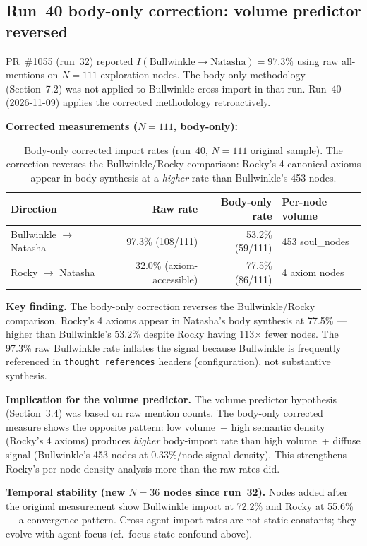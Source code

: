 \documentclass[11pt]{article}
\begin{document}
\subsection{Run~40 body-only correction: volume predictor reversed}

PR~\#1055 (run~32) reported $I(\text{Bullwinkle} \to \text{Natasha}) = 97.3\%$
using raw all-mentions on $N=111$ exploration nodes. The body-only methodology
(Section~7.2) was not applied to Bullwinkle cross-import in that run. Run~40
(2026-11-09) applies the corrected methodology retroactively.

\textbf{Corrected measurements ($N=111$, body-only):}

\begin{table}[h]
\centering
\begin{tabular}{lrrl}
\toprule
Direction & Raw rate & Body-only rate & Per-node volume \\
\midrule
Bullwinkle $\to$ Natasha & 97.3\% (108/111) & 53.2\% (59/111) & 453 soul\_nodes \\
Rocky $\to$ Natasha & 32.0\% (axiom-accessible) & 77.5\% (86/111) & 4 axiom nodes \\
\bottomrule
\end{tabular}
\caption{Body-only corrected import rates (run~40, $N=111$ original sample). The
correction reverses the Bullwinkle/Rocky comparison: Rocky's 4 canonical axioms
appear in body synthesis at a \emph{higher} rate than Bullwinkle's 453 nodes.}
\end{table}

\textbf{Key finding.} The body-only correction reverses the Bullwinkle/Rocky comparison.
Rocky's 4 axioms appear in Natasha's body synthesis at 77.5\% --- higher than
Bullwinkle's 53.2\% despite Rocky having 113$\times$ fewer nodes. The 97.3\% raw
Bullwinkle rate inflates the signal because Bullwinkle is frequently referenced in
\texttt{thought\_references} headers (configuration), not substantive synthesis.

\textbf{Implication for the volume predictor.} The volume predictor hypothesis (Section~3.4)
was based on raw mention counts. The body-only corrected measure shows the opposite
pattern: low volume~+ high semantic density (Rocky's 4 axioms) produces \emph{higher}
body-import rate than high volume~+ diffuse signal (Bullwinkle's 453 nodes at
0.33\%/node signal density). This strengthens Rocky's per-node density analysis more
than the raw rates did.

\textbf{Temporal stability (new $N=36$ nodes since run~32).} Nodes added after the original
measurement show Bullwinkle import at 72.2\% and Rocky at 55.6\% --- a convergence
pattern. Cross-agent import rates are not static constants; they evolve with agent focus
(cf.\ focus-state confound above).
\end{document}
